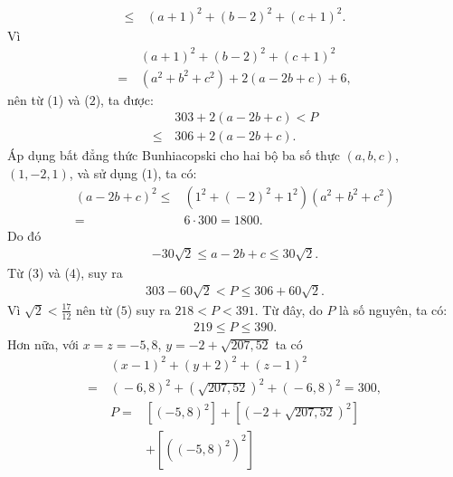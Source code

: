 \begin{multicols}{2}
\begin{align*}
		\le \,&{\left( {a + 1} \right)^2} + {\left( {b - 2} \right)^2} + {\left( {c + 1} \right)^2}. \tag{$2$}
	\end{align*}
	Vì
	\begin{align*}
		&{\left( {a + 1} \right)^2} + {\left( {b - 2} \right)^2} + {\left( {c + 1} \right)^2}\\
		 = \,&\left( {{a^2} + {b^2} + {c^2}} \right) + 2\left( {a - 2b + c} \right) + 6,
	\end{align*}
	nên từ ($1$) và ($2$), ta được:
	\begin{align*}
		&303 + 2\left( {a - 2b + c} \right) < P \\
		\le \,&306 + 2\left( {a - 2b + c} \right). \tag{$3$}
	\end{align*}
	Áp dụng bất đẳng thức Bunhiacopski cho hai bộ ba số thực $(a, b, c)$, $(1, -2, 1)$, và sử dụng ($1$), ta có:
	\begin{align*}
		{\left( {a \!-\! 2b \!+\! c} \right)^2}\!\le \!&\left(\!{{1^2}\! +\! {{\left( { \!-\! 2} \right)}^2} \!+\! {1^2}} \!\right)\!\!\left(\!{{a^2} \!+\! {b^2} \!+\! {c^2}} \!\right)\\
		= &6 \cdot 300 = 1800.
	\end{align*}
	Do đó
	\begin{align*}
		 - 30\sqrt 2  \le a - 2b + c \le 30\sqrt 2 . \tag{$4$}
	\end{align*}
	Từ ($3$) và ($4$), suy ra
	\begin{align*}
		303 - 60\sqrt 2  < P \le 306 + 60\sqrt 2 . \tag{$5$}
	\end{align*}
	Vì  $\sqrt{2} < \frac{17}{12}$ nên từ ($5$) suy ra $218 <P< 391$. Từ đây, do $P$ là số nguyên, ta có:
	\begin{align*}
		219 \le P \le 390.
	\end{align*}
	Hơn nữa, với  $x=z = -5{,}8$, $y =- 2 + \sqrt{207{,}52}$  ta có
	\begin{align*}
		&{\left( {x - 1} \right)^2} + {\left( {y + 2} \right)^2} + {\left( {z - 1} \right)^2}\\
		= \,&{\left( { \!-\! 6,8} \right)^2} \!+\! {\left( \!{\sqrt {207,52} } \right)^2} \!+\! {\left( { \!-\! 6,8} \right)^2} \!=\! 300,
	\end{align*}
	\begin{align*}
		P =& \left[ {{{\left( { - 5,8} \right)}^2}} \right] + \left[ {{{\left( { - 2 + \sqrt {207,52} } \right)}^2}} \right] \\[-0.3ex]
		&+ \left[ {{{\left( {{{\left( { - 5,8} \right)}^2}} \right)}^2}} \right]\\[-0.3ex]

\end{align*}
\end{multicols}
